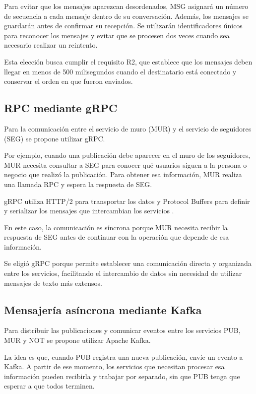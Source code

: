 \documentclass[12pt,a4paper]{article}
\begin{document}
Para evitar que los mensajes aparezcan desordenados, MSG asignará un número de secuencia a cada mensaje dentro de su conversación. Además, los mensajes se guardarán antes de confirmar su recepción. Se utilizarán identificadores únicos para reconocer los mensajes y evitar que se procesen dos veces cuando sea necesario realizar un reintento.

Esta elección busca cumplir el requisito R2, que establece que los mensajes deben llegar en menos de 500 milisegundos cuando el destinatario está conectado y conservar el orden en que fueron enviados.

\subsection{RPC mediante gRPC}

Para la comunicación entre el servicio de muro (MUR) y el servicio de seguidores (SEG) se propone utilizar gRPC.

Por ejemplo, cuando una publicación debe aparecer en el muro de los seguidores, MUR necesita consultar a SEG para conocer qué usuarios siguen a la persona o negocio que realizó la publicación. Para obtener esa información, MUR realiza una llamada RPC y espera la respuesta de SEG.

gRPC utiliza HTTP/2 para transportar los datos y Protocol Buffers para definir y serializar los mensajes que intercambian los servicios \cite{grpc}.

En este caso, la comunicación es síncrona porque MUR necesita recibir la respuesta de SEG antes de continuar con la operación que depende de esa información.

Se eligió gRPC porque permite establecer una comunicación directa y organizada entre los servicios, facilitando el intercambio de datos sin necesidad de utilizar mensajes de texto más extensos.

\subsection{Mensajería asíncrona mediante Kafka}

Para distribuir las publicaciones y comunicar eventos entre los servicios PUB, MUR y NOT se propone utilizar Apache Kafka.

La idea es que, cuando PUB registra una nueva publicación, envíe un evento a Kafka. A partir de ese momento, los servicios que necesitan procesar esa información pueden recibirla y trabajar por separado, sin que PUB tenga que esperar a que todos terminen.
\end{document}
